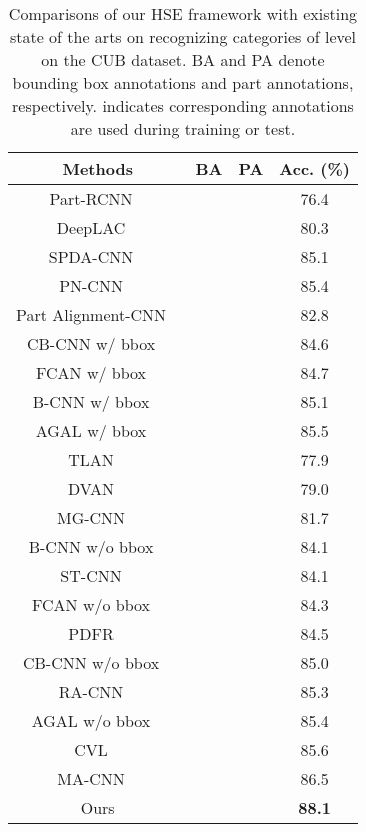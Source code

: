 \documentclass[sigconf]{acmart}
\begin{document}
\begin{table}[!t]
\centering
\begin{tabular}{c|c|c|c}
\hline
\centering  Methods  & BA & PA  & Acc. (\%)  \\
\hline
\hline
Part-RCNN ~\cite{zhang2014part} &  &  & 76.4 \\
DeepLAC ~\cite{lin2015deep} &  &  & 80.3 \\
SPDA-CNN ~\cite{zhang2016spda} &  &  & 85.1 \\
PN-CNN ~\cite{branson2014bird} &  &  & 85.4 \\
Part Alignment-CNN ~\cite{krause2015fine} &  & & 82.8 \\
CB-CNN w/ bbox ~\cite{gao2016compact} &  && 84.6 \\
FCAN w/ bbox ~\cite{liu2016fully} &  &  & 84.7 \\
B-CNN w/ bbox ~\cite{lin2015bilinear} &  & & 85.1 \\
AGAL w/ bbox ~\cite{liu2017localizing} &  & & 85.5 \\
\hline
\hline
TLAN ~\cite{xiao2015application} & & & 77.9 \\
DVAN ~\cite{zhao2017diversified} & & & 79.0 \\
MG-CNN ~\cite{wang2015multiple} & & &81.7 \\
B-CNN w/o bbox ~\cite{lin2015bilinear} & & & 84.1 \\
ST-CNN ~\cite{jaderberg2015spatial} & & & 84.1 \\
FCAN w/o bbox ~\cite{liu2016fully} & &  & 84.3 \\
PDFR ~\cite{zhang2016picking} & & & 84.5 \\
CB-CNN w/o bbox ~\cite{gao2016compact} &&& 85.0 \\
RA-CNN ~\cite{fu2017look} & &  & 85.3 \\
AGAL w/o bbox ~\cite{liu2017localizing} & &  & 85.4 \\
CVL ~\cite{he2017fine} & & & 85.6 \\
MA-CNN ~\cite{zheng2017learning} & & & 86.5\\
\hline
\hline
Ours & & & \textbf{88.1} \\ 
\hline
\end{tabular}
\caption{Comparisons of our HSE framework with existing state of the arts on recognizing categories of level  on the CUB dataset. BA and PA denote bounding box annotations and part annotations, respectively.  indicates corresponding annotations are used during training or test. }
\label{table:cub-sota}
\end{table}
\end{document}
